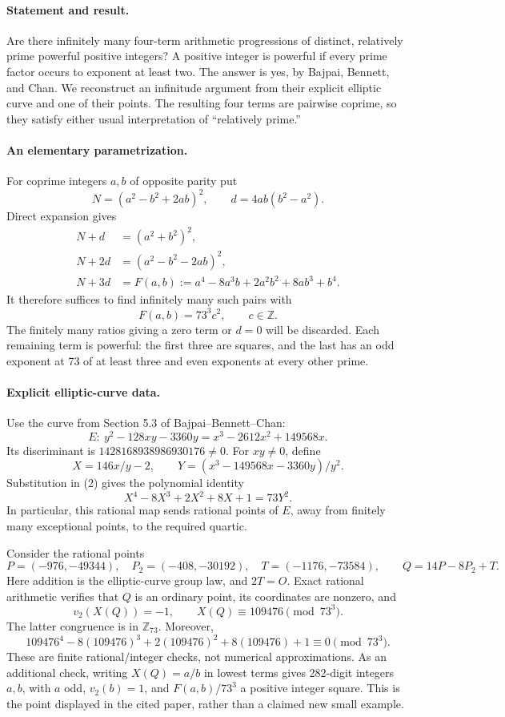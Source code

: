 \paragraph{Statement and result.}
Are there infinitely many four-term arithmetic progressions of distinct, relatively prime powerful positive integers? A positive integer is powerful if every prime factor occurs to exponent at least two. The answer is yes, by Bajpai, Bennett, and Chan. We reconstruct an infinitude argument from their explicit elliptic curve and one of their points. The resulting four terms are pairwise coprime, so they satisfy either usual interpretation of ``relatively prime.''

\paragraph{An elementary parametrization.}
For coprime integers \(a,b\) of opposite parity put
\[
 N=(a^2-b^2+2ab)^2,\qquad d=4ab(b^2-a^2).
\]
Direct expansion gives
\begin{align*}
 N+d&=(a^2+b^2)^2,\\
 N+2d&=(a^2-b^2-2ab)^2,\\
 N+3d&=F(a,b):=a^4-8a^3b+2a^2b^2+8ab^3+b^4.
\end{align*}
It therefore suffices to find infinitely many such pairs with
\[
 F(a,b)=73^3c^2,\qquad c\in\mathbb Z. \tag{1}
\]
The finitely many ratios giving a zero term or \(d=0\) will be discarded. Each remaining term is powerful: the first three are squares, and the last has an odd exponent at 73 of at least three and even exponents at every other prime.

\paragraph{Explicit elliptic-curve data.}
Use the curve from Section 5.3 of Bajpai--Bennett--Chan:
\[
 E:\ y^2-128xy-3360y=x^3-2612x^2+149568x. \tag{2}
\]
Its discriminant is \(1428168938986930176\ne0\). For \(xy\ne0\), define
\[
 X=146x/y-2,\qquad Y=(x^3-149568x-3360y)/y^2.
\]
Substitution in (2) gives the polynomial identity
\[
 X^4-8X^3+2X^2+8X+1=73Y^2. \tag{3}
\]
In particular, this rational map sends rational points of \(E\), away from finitely many exceptional points, to the required quartic.

Consider the rational points
\[
 P=(-976,-49344),\quad P_2=(-408,-30192),\quad
 T=(-1176,-73584),\qquad Q=14P-8P_2+T.
\]
Here addition is the elliptic-curve group law, and \(2T=O\). Exact rational arithmetic verifies that \(Q\) is an ordinary point, its coordinates are nonzero, and
\[
 v_2(X(Q))=-1,\qquad
 X(Q)\equiv109476\pmod{73^3}. \tag{4}
\]
The latter congruence is in \(\mathbb Z_{73}\). Moreover,
\[
 109476^4-8(109476)^3+2(109476)^2+8(109476)+1
 \equiv0\pmod{73^3}. \tag{5}
\]
These are finite rational/integer checks, not numerical approximations. As an additional check, writing \(X(Q)=a/b\) in lowest terms gives 282-digit integers \(a,b\), with \(a\) odd, \(v_2(b)=1\), and \(F(a,b)/73^3\) a positive integer square. This is the point displayed in the cited paper, rather than a claimed new small example.

